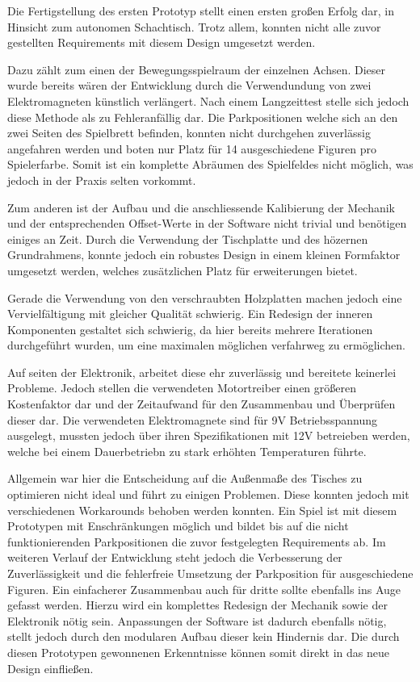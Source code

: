 Die Fertigstellung des ersten Prototyp stellt einen ersten großen Erfolg
dar, in Hinsicht zum autonomen Schachtisch. Trotz allem, konnten nicht
alle zuvor gestellten Requirements mit diesem Design umgesetzt werden.

Dazu zählt zum einen der Bewegungsspielraum der einzelnen Achsen. Dieser
wurde bereits wären der Entwicklung durch die Verwendundung von zwei
Elektromagneten künstlich verlängert. Nach einem Langzeittest stelle
sich jedoch diese Methode als zu Fehleranfällig dar. Die Parkpositionen
welche sich an den zwei Seiten des Spielbrett befinden, konnten nicht
durchgehen zuverlässig angefahren werden und boten nur Platz für 14
ausgeschiedene Figuren pro Spielerfarbe. Somit ist ein komplette
Abräumen des Spielfeldes nicht möglich, was jedoch in der Praxis selten
vorkommt.

Zum anderen ist der Aufbau und die anschliessende Kalibierung der
Mechanik und der entsprechenden Offset-Werte in der Software nicht
trivial und benötigen einiges an Zeit. Durch die Verwendung der
Tischplatte und des hözernen Grundrahmens, konnte jedoch ein robustes
Design in einem kleinen Formfaktor umgesetzt werden, welches
zusätzlichen Platz für erweiterungen bietet.

Gerade die Verwendung von den verschraubten Holzplatten machen jedoch
eine Vervielfältigung mit gleicher Qualität schwierig. Ein Redesign der
inneren Komponenten gestaltet sich schwierig, da hier bereits mehrere
Iterationen durchgeführt wurden, um eine maximalen möglichen verfahrweg
zu ermöglichen.

Auf seiten der Elektronik, arbeitet diese ehr zuverlässig und bereitete
keinerlei Probleme. Jedoch stellen die verwendeten Motortreiber einen
größeren Kostenfaktor dar und der Zeitaufwand für den Zusammenbau und
Überprüfen dieser dar. Die verwendeten Elektromagnete sind für 9V
Betriebsspannung ausgelegt, mussten jedoch über ihren Spezifikationen
mit 12V betreieben werden, welche bei einem Dauerbetriebn zu stark
erhöhten Temperaturen führte.

Allgemein war hier die Entscheidung auf die Außenmaße des Tisches zu
optimieren nicht ideal und führt zu einigen Problemen. Diese konnten
jedoch mit verschiedenen Workarounds behoben werden konnten. Ein Spiel
ist mit diesem Prototypen mit Enschränkungen möglich und bildet bis auf
die nicht funktionierenden Parkpositionen die zuvor festgelegten
Requirements ab. Im weiteren Verlauf der Entwicklung steht jedoch die
Verbesserung der Zuverlässigkeit und die fehlerfreie Umsetzung der
Parkposition für ausgeschiedene Figuren. Ein einfacherer Zusammenbau
auch für dritte sollte ebenfalls ins Auge gefasst werden. Hierzu wird
ein komplettes Redesign der Mechanik sowie der Elektronik nötig sein.
Anpassungen der Software ist dadurch ebenfalls nötig, stellt jedoch
durch den modularen Aufbau dieser kein Hindernis dar. Die durch diesen
Prototypen gewonnenen Erkenntnisse können somit direkt in das neue
Design einfließen.


